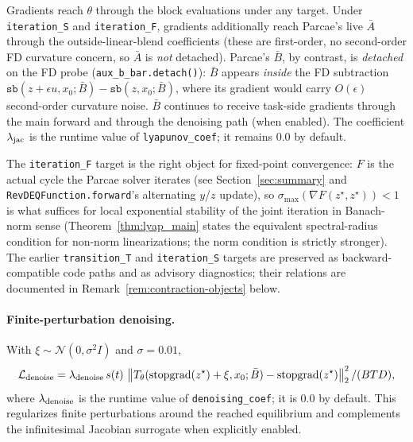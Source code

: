 \documentclass[11pt]{article}
\newcommand{\stopgrad}{\operatorname{stopgrad}}
\begin{document}
Gradients reach $\theta$ through the block evaluations under any target.
Under \texttt{iteration\_S} and \texttt{iteration\_F}, gradients
additionally reach Parcae's live $\bar A$ through the outside-linear-blend
coefficients (these are first-order, no second-order FD curvature concern,
so $\bar A$ is \emph{not} detached).  Parcae's $\bar B$, by contrast, is
\emph{detached} on the FD probe (\texttt{aux\_b\_bar.detach()}): $\bar B$
appears \emph{inside} the FD subtraction $\texttt{sb}(z+\epsilon u, x_0; \bar B)
- \texttt{sb}(z, x_0; \bar B)$, where its gradient would carry $O(\epsilon)$
second-order curvature noise.  $\bar B$ continues to receive task-side
gradients through the main forward and through the denoising path (when
enabled).  The coefficient $\lambda_{\rm jac}$ is the runtime value of
\texttt{lyapunov\_coef}; it remains $0.0$ by default.

The \texttt{iteration\_F} target is the right object for fixed-point
convergence: $F$ is the actual cycle the Parcae solver iterates (see
Section~\ref{sec:summary} and \texttt{RevDEQFunction.forward}'s alternating
$y$/$z$ update), so $\sigma_{\max}(\nabla F(z^\star, z^\star))<1$ is what
suffices for local exponential stability of the joint iteration in
Banach-norm sense (Theorem~\ref{thm:lyap_main} states the equivalent
spectral-radius condition for non-norm linearizations; the norm condition
is strictly stronger).  The earlier \texttt{transition\_T} and
\texttt{iteration\_S} targets are preserved as backward-compatible code
paths and as advisory diagnostics; their relations are documented in
Remark~\ref{rem:contraction-objects} below.

\paragraph{Finite-perturbation denoising.}
With $\xi\sim\mathcal{N}(0,\sigma^2I)$ and $\sigma=0.01$,
\[
  \mathcal{L}_{\rm denoise}
    = \lambda_{\rm denoise}\,s(t)\,
      \left\|
        T_\theta(\stopgrad(z^\star)+\xi,x_0;\bar B)-\stopgrad(z^\star)
      \right\|_2^2/(BTD),
\]
where $\lambda_{\rm denoise}$ is the runtime value of
\texttt{denoising\_coef}; it is $0.0$ by default.  This regularizes finite
perturbations around the reached equilibrium and complements the infinitesimal
Jacobian surrogate when explicitly enabled.
\end{document}
